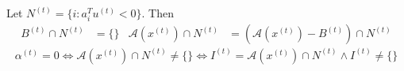 \begin{lemma}
Let $N^{(t)} = \{i: a_i^Tu^{(t)} < 0\}$. Then
\begin{align*}
B^{(t)} \cap N^{(t)} &= \{\}
& \mathcal{A}(x^{(t)}) \cap N^{(t)} &= (\mathcal{A}(x^{(t)}) - B^{(t)}) \cap N^{(t)}
\end{align*}
\[ \alpha^{(t)} = 0 \iff \mathcal{A}(x^{(t)}) \cap N^{(t)} \neq \{\}
\iff I^{(t)} = \mathcal{A}(x^{(t)}) \cap N^{(t)} \wedge I^{(t)} \neq \{\} \]
\end{lemma}


